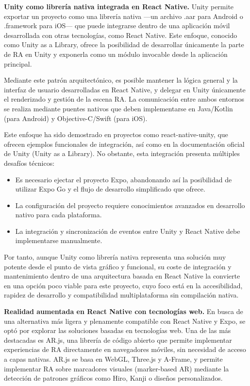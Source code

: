 \textbf{Unity como librería nativa integrada en React Native.}
Unity permite exportar un proyecto como una librería nativa —un archivo .aar para Android o .framework para iOS— que puede integrarse dentro de una aplicación móvil desarrollada con otras tecnologías, como React Native. Este enfoque, conocido como Unity as a Library, ofrece la posibilidad de desarrollar únicamente la parte de RA en Unity y exponerla como un módulo invocable desde la aplicación principal.

Mediante este patrón arquitectónico, es posible mantener la lógica general y la interfaz de usuario desarrolladas en React Native, y delegar en Unity únicamente el renderizado y gestión de la escena RA. La comunicación entre ambos entornos se realiza mediante puentes nativos que deben implementarse en Java/Kotlin (para Android) y Objective-C/Swift (para iOS).

Este enfoque ha sido demostrado en proyectos como react-native-unity, que ofrecen ejemplos funcionales de integración, así como en la documentación oficial de Unity (Unity as a Library). No obstante, esta integración presenta múltiples desafíos técnicos:

\begin{itemize}
    \item Es necesario ejectar el proyecto Expo, abandonando así la posibilidad de utilizar Expo Go y el flujo de desarrollo simplificado que ofrece.
    \item La configuración del proyecto requiere conocimientos avanzados en desarrollo nativo para cada plataforma.
    \item La integración y sincronización de eventos entre Unity y React Native debe implementarse manualmente.
\end{itemize}

Por tanto, aunque Unity como librería nativa representa una solución muy potente desde el punto de vista gráfico y funcional, su coste de integración y mantenimiento dentro de una arquitectura basada en React Native la convierte en una opción poco viable para este proyecto, cuyo foco está en la accesibilidad, rapidez de desarrollo y compatibilidad multiplataforma sin compilación nativa.

\textbf{Realidad aumentada en React Native con tecnologías web.}
En busca de una alternativa más ligera y plenamente compatible con React Native y Expo, se optó por explorar las soluciones basadas en tecnologías web. Una de las más destacadas es AR.js, una librería de código abierto que permite implementar experiencias de RA directamente en navegadores móviles, sin necesidad de acceso a capas nativas. AR.js se basa en WebGL, Three.js y A-Frame, y permite implementar RA sobre marcadores visuales (marker-based AR) mediante la detección de patrones gráficos como Hiro, Kanji o diseños personalizados.

